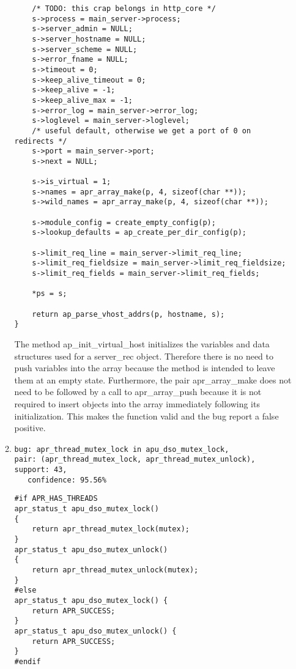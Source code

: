 \documentclass{article}
\begin{document}
\begin{enumerate}[(a)]
\begin{enumerate}
\begin{lstlisting}
    /* TODO: this crap belongs in http_core */
    s->process = main_server->process;
    s->server_admin = NULL;
    s->server_hostname = NULL;
    s->server_scheme = NULL;
    s->error_fname = NULL;
    s->timeout = 0;
    s->keep_alive_timeout = 0;
    s->keep_alive = -1;
    s->keep_alive_max = -1;
    s->error_log = main_server->error_log;
    s->loglevel = main_server->loglevel;
    /* useful default, otherwise we get a port of 0 on redirects */
    s->port = main_server->port;
    s->next = NULL;

    s->is_virtual = 1;
    s->names = apr_array_make(p, 4, sizeof(char **));
    s->wild_names = apr_array_make(p, 4, sizeof(char **));

    s->module_config = create_empty_config(p);
    s->lookup_defaults = ap_create_per_dir_config(p);

    s->limit_req_line = main_server->limit_req_line;
    s->limit_req_fieldsize = main_server->limit_req_fieldsize;
    s->limit_req_fields = main_server->limit_req_fields;

    *ps = s;

    return ap_parse_vhost_addrs(p, hostname, s);
}
        \end{lstlisting}

        The method ap\_init\_virtual\_host initializes the variables and data structures used for a server\_rec object. Therefore there is no need to push variables into the array because the method is intended to leave them at an empty state. Furthermore, the pair apr\_array\_make does not need to be followed by a call to apr\_array\_push because it is not required to insert objects into the array immediately following its initialization. This makes the function valid and the bug report a false positive.

      \item
        \begin{lstlisting}
bug: apr_thread_mutex_lock in apu_dso_mutex_lock, 
pair: (apr_thread_mutex_lock, apr_thread_mutex_unlock), support: 43,
   confidence: 95.56%
        \end{lstlisting}

        \begin{lstlisting}
#if APR_HAS_THREADS
apr_status_t apu_dso_mutex_lock()
{
    return apr_thread_mutex_lock(mutex);
}
apr_status_t apu_dso_mutex_unlock()
{
    return apr_thread_mutex_unlock(mutex);
}
#else
apr_status_t apu_dso_mutex_lock() {
    return APR_SUCCESS;
}
apr_status_t apu_dso_mutex_unlock() {
    return APR_SUCCESS;
}
#endif
        \end{lstlisting}


\end{enumerate}
\end{enumerate}
\end{document}
